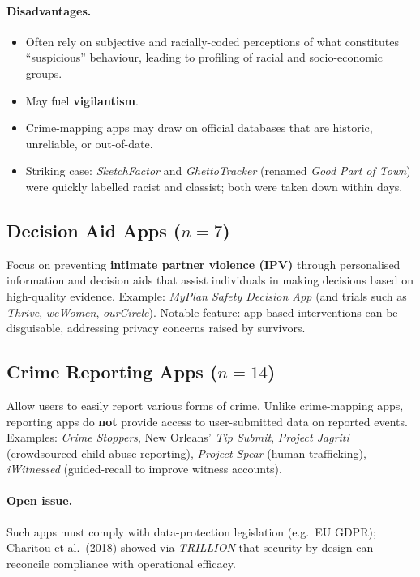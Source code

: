 \documentclass[11pt,a4paper,openany]{report}
\theoremstyle{definition}
\theoremstyle{plain}
\theoremstyle{remark}
\begin{document}
\paragraph{Disadvantages.}
\begin{itemize}
    \item Often rely on subjective and racially-coded perceptions of what constitutes ``suspicious'' behaviour, leading to profiling of racial and socio-economic groups.
    \item May fuel \textbf{vigilantism}.
    \item Crime-mapping apps may draw on official databases that are historic, unreliable, or out-of-date.
    \item Striking case: \textit{SketchFactor} and \textit{GhettoTracker} (renamed \textit{Good Part of Town}) were quickly labelled racist and classist; both were taken down within days.
\end{itemize}

\subsection{Decision Aid Apps ($n = 7$)}

Focus on preventing \textbf{intimate partner violence (IPV)} through personalised information and decision aids that assist individuals in making decisions based on high-quality evidence. Example: \textit{MyPlan Safety Decision App} (and trials such as \textit{Thrive}, \textit{weWomen}, \textit{ourCircle}). Notable feature: app-based interventions can be disguisable, addressing privacy concerns raised by survivors.

\subsection{Crime Reporting Apps ($n = 14$)}

Allow users to easily report various forms of crime. Unlike crime-mapping apps, reporting apps do \textbf{not} provide access to user-submitted data on reported events. Examples: \textit{Crime Stoppers}, New Orleans' \textit{Tip Submit}, \textit{Project Jagriti} (crowdsourced child abuse reporting), \textit{Project Spear} (human trafficking), \textit{iWitnessed} (guided-recall to improve witness accounts).

\paragraph{Open issue.} Such apps must comply with data-protection legislation (e.g.\ EU GDPR); Charitou et al.\ (2018) showed via \textit{TRILLION} that security-by-design can reconcile compliance with operational efficacy.
\end{document}
